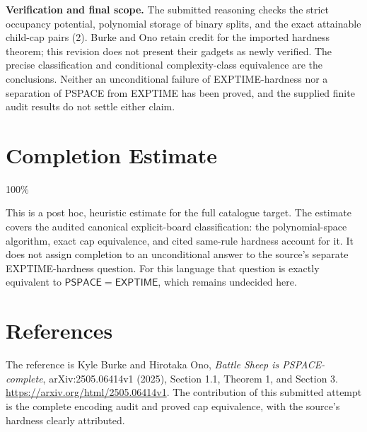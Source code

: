 \documentclass[11pt]{article}
\begin{document}
\textbf{Verification and final scope.} The submitted reasoning checks the
strict occupancy potential, polynomial storage of binary splits, and
the exact attainable child-cap pairs (2). Burke and Ono retain credit
for the imported hardness theorem; this revision does not present their
gadgets as newly verified. The precise classification and conditional
complexity-class equivalence are the conclusions. Neither an
unconditional failure of EXPTIME-hardness nor a separation of PSPACE from
EXPTIME has been proved, and the supplied finite audit results do not
settle either claim.

\section{Completion Estimate}
100\%

This is a post hoc, heuristic estimate for the full catalogue target.
The estimate covers the audited canonical explicit-board classification:
the polynomial-space algorithm, exact cap equivalence, and cited same-rule
hardness account for it. It does not assign completion to an unconditional
answer to the source's separate EXPTIME-hardness question. For this
language that question is exactly equivalent to
$\mathsf{PSPACE}=\mathsf{EXPTIME}$, which remains undecided here.

\section*{References}
The reference is Kyle Burke and Hirotaka Ono,
\emph{Battle Sheep is PSPACE-complete}, arXiv:2505.06414v1 (2025),
Section 1.1, Theorem 1, and Section 3.
\url{https://arxiv.org/html/2505.06414v1}.
The contribution of this submitted attempt is the complete encoding audit
and proved cap equivalence, with the source's hardness clearly attributed.
\end{document}
